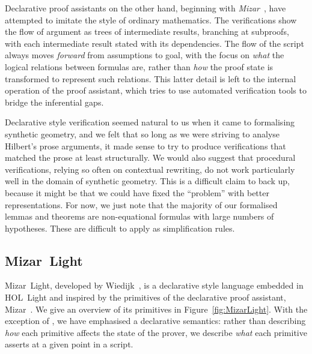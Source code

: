 Declarative proof assistants on the other hand, beginning with \emph{Mizar}~\cite{MizarMathematicalVernacular}, have attempted to imitate the style of ordinary mathematics. The verifications show the flow of argument as trees of intermediate results, branching at subproofs, with each intermediate result stated with its dependencies. The flow of the script always moves \emph{forward} from assumptions to goal, with the focus on \emph{what} the logical relations between formulas are, rather than \emph{how} the proof state is transformed to represent such relations. This latter detail is left to the internal operation of the proof assistant, which tries to use automated verification tools to bridge the inferential gaps.

Declarative style verification seemed natural to us when it came to formalising synthetic geometry, and we felt that so long as we were striving to analyse Hilbert's prose arguments, it made sense to try to produce verifications that matched the prose at least structurally. We would also suggest that procedural verifications, relying so often on contextual rewriting, do not work particularly well in the domain of synthetic geometry. This is a difficult claim to back up, because it might be that we could have fixed the ``problem'' with better representations. For now, we just note that the majority of our formalised lemmas and theorems are non-equational formulas with large numbers of hypotheses. These are difficult to apply as simplification rules.

\subsection{Mizar~Light}\label{sec:MizarLight}
Mizar~Light, developed by Wiedijk~\cite{MizarLight}, is a declarative style language embedded in HOL~Light and inspired by the primitives of the declarative proof assistant, Mizar~\cite{MizarMathematicalVernacular}. We give an overview of its primitives in Figure~\ref{fig:MizarLight}. With the exception of , we have emphasised a declarative semantics: rather than describing \emph{how} each primitive affects the state of the prover, we describe \emph{what} each primitive asserts at a given point in a script.

